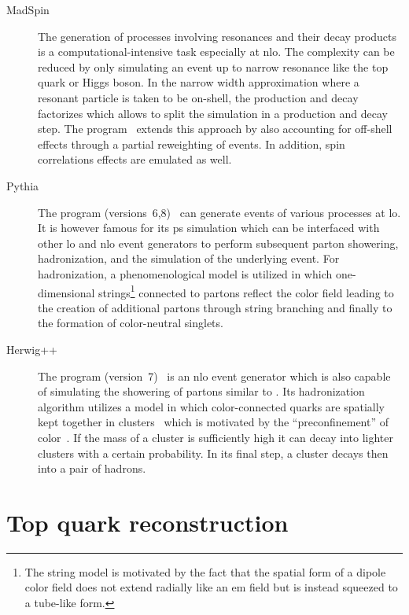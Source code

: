\begin{description}
\item[MadSpin] The generation of processes involving resonances and their decay products is a computational-intensive task especially at \gls{nlo}. The complexity can be reduced by only simulating an event up to narrow resonance like the top quark or Higgs boson. In the narrow width approximation where a resonant particle is taken to be on-shell, the production and decay factorizes which allows to split the simulation in a production and decay step. The \MADSPIN[] program~\cite{Artoisenet:2012st} extends this approach by also accounting for off-shell effects through a partial reweighting of events. In addition, spin correlations effects are emulated as well.

\item[Pythia] The \PYTHIA[] program (versions~6,8)~\cite{Sjostrand:2006za,Sjostrand:2014zea} can generate events of various processes at \gls{lo}. It is however famous for its \gls{ps} simulation which can be interfaced with other \gls{lo} and \gls{nlo} event generators to perform subsequent parton showering, hadronization, and the simulation of the underlying event. For hadronization, a phenomenological model is utilized in which one-dimensional strings\footnote{The string model is motivated by the fact that the spatial form of a dipole color field does not extend radially like an \gls{em} field but is instead squeezed to a tube-like form.} connected to partons reflect the color field leading to the creation of additional partons through string branching and finally to the formation of color-neutral singlets.

\item[Herwig++] The \HERWIG[] program (version~7)~\cite{Bellm:2015jjp} is an \gls{nlo} event generator which is also capable of simulating the showering of partons similar to \PYTHIA. Its hadronization algorithm utilizes a model in which color-connected quarks are spatially kept together in clusters~\cite{Webber:1983if} which is motivated by the ``preconfinement'' of color~\cite{Amati:1979fg}. If the mass of a cluster is sufficiently high it can decay into lighter clusters with a certain probability. In its final step, a cluster decays then into a pair of hadrons.
\end{description}




\section{Top quark reconstruction}


